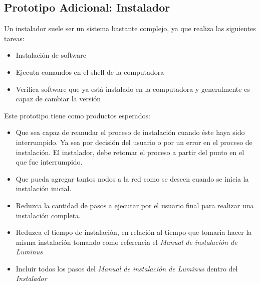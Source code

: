   

\subsection{Prototipo Adicional: Instalador} 

Un instalador suele ser un sistema bastante complejo, ya que realiza las siguientes tareas: \\ 

\begin{itemize} 

    \item Instalación de software 

    \item Ejecuta comandos en el shell de la computadora 

    \item Verifica software que ya está instalado en la computadora y generalmente es capaz de cambiar la versión 

\end{itemize} 

Este prototipo tiene como productos esperados: 

\begin{itemize} 

    \item Que sea capaz de reanudar el proceso de instalación cuando éste haya sido interrumpido. Ya sea por decisión del usuario o por un error en el proceso de instalación. El instalador, debe retomar el proceso a partir del punto en el que fue interrumpido. 

    \item Que pueda agregar tantos nodos a la red como se deseen cuando se inicia la instalación inicial. 

    \item Reduzca la cantidad de pasos a ejecutar por el usuario final para realizar una instalación completa. 

    \item Reduzca el tiempo de instalación, en relación al tiempo que tomaria hacer la misma instalación tomando como referencia el \emph{Manual de instalación de Luminus} 

    \item Incluir todos los pasos del \emph{Manual de instalación de Luminus} dentro del \emph{Instalador} 

\end{itemize} 